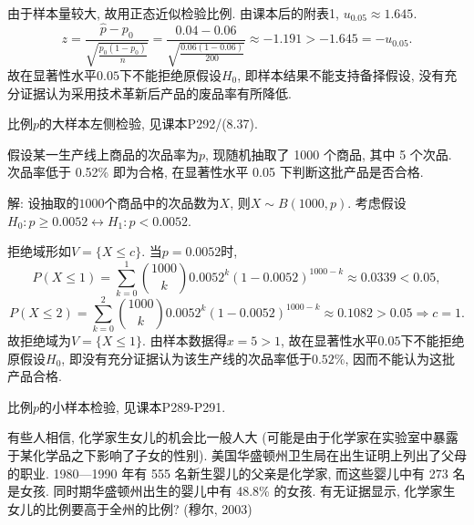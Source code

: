 \documentclass[standard]{ExBook}
\renewenvironment{shaded}{%
  \def\FrameCommand{\fboxsep=\FrameSep \colorbox{shadecolor}}%
  \MakeFramed{\advance\hsize-\width \FrameRestore}%
}{%
  \endMakeFramed
}
\begin{document}
\begin{qitems}
由于样本量较大, 故用正态近似检验比例. 由课本后的附表1, $u_{0.05}\approx1.645$.
$$
z
=
\frac{\hat{p}-p_0}
{\sqrt{\frac{p_0(1-p_0)}{n}}}
=
\frac{0.04-0.06}
{\sqrt{\frac{0.06(1-0.06)}{200}}}
\approx-1.191
>
-1.645
=
-u_{0.05}.
$$
故在显著性水平$0.05$下不能拒绝原假设$H_0$, 即样本结果不能支持备择假设, 没有充分证据认为采用技术革新后产品的废品率有所降低.

\textcolor{themeColor}{\selectfont {} 比例$p$的大样本左侧检验, 见课本P292/(8.37).}

\vspace{2.5cm-5em}

    \begin{bbox}
    \begin{shaded}
        \qitem
假设某一生产线上商品的次品率为$p$, 现随机抽取了 1000 个商品, 其中 5 个次品. 次品率低于 0.52\% 即为合格, 在显著性水平 0.05 下判断这批产品是否合格.
    \end{shaded}
    \end{bbox}

\vspace{\dimexpr2.5cm-5em\relax}

解: 设抽取的$1000$个商品中的次品数为$X$, 则$X\sim B(1000,p)$. 考虑假设
$
H_0:p\geq0.0052
\longleftrightarrow
H_1:p<0.0052
$.

拒绝域形如$V=\{X\leq c\}$. 当$p=0.0052$时,
$$
P(X\leq1)
=
\sum_{k=0}^{1}\binom{1000}{k}0.0052^k(1-0.0052)^{1000-k}
\approx0.0339
<0.05,
$$
$$
P(X\leq2)
=
\sum_{k=0}^{2}\binom{1000}{k}0.0052^k(1-0.0052)^{1000-k}
\approx0.1082
>0.05
\Longrightarrow
c=1.
$$
故拒绝域为$V=\{X\leq1\}$. 由样本数据得$x=5>1$, 故在显著性水平$0.05$下不能拒绝原假设$H_0$, 即没有充分证据认为该生产线的次品率低于$0.52\%$, 因而不能认为这批产品合格.

\textcolor{themeColor}{\selectfont {} 比例$p$的小样本检验, 见课本P289-P291.}

\vspace{2.5cm-5em}

    \begin{bbox}
    \begin{shaded}
        \qitem
有些人相信, 化学家生女儿的机会比一般人大 (可能是由于化学家在实验室中暴露于某化学品之下影响了子女的性别). 美国华盛顿州卫生局在出生证明上列出了父母的职业. 1980—1990 年有 555 名新生婴儿的父亲是化学家, 而这些婴儿中有 273 名是女孩. 同时期华盛顿州出生的婴儿中有 48.8\% 的女孩. 有无证据显示, 化学家生女儿的比例要高于全州的比例? (穆尔, 2003)
    \end{shaded}
    \end{bbox}


\end{qitems}
\end{document}
